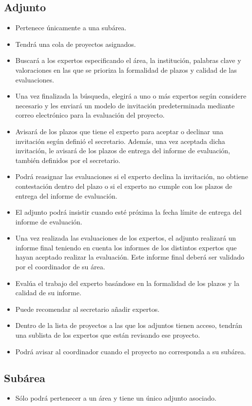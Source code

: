 \documentclass[12pt,a4paper,spanish,twoside]{book}
\begin{document}
\subsection{Adjunto}
\begin{itemize}
\item Pertenece únicamente a una subárea.
\item Tendrá una cola de proyectos asignados.
\item Buscará a los expertos especificando el área, la institución, palabras
  clave y valoraciones en las que se prioriza la formalidad de plazos y
  calidad de las evaluaciones. 
\item Una vez finalizada la búsqueda, elegirá a uno o más expertos según
  considere necesario y les enviará un modelo de invitación predeterminada
  mediante correo electrónico para la  evaluación del proyecto.  
\item Avisará de los plazos que tiene el experto para aceptar o declinar una
  invitación según definió el secretario. Además, una vez aceptada dicha
  invitación, le avisará de los plazos de entrega del informe de evaluación,
  también definidos por el secretario. 
\item Podrá reasignar las evaluaciones si el experto declina la invitación,
  no obtiene contestación dentro del plazo o si el experto no cumple con los
  plazos de entrega del informe de evaluación.
\item El adjunto podrá insistir cuando esté próxima la fecha límite de
  entrega del informe de evaluación. 
\item Una vez realizada las evaluaciones de los expertos, el adjunto
  realizará un informe final teniendo en cuenta los informes de los distintos
  expertos que hayan aceptado realizar la evaluación. Este informe final
  deberá ser validado por el coordinador de su área. 
\item Evalúa el trabajo del experto basándose en la formalidad de los plazos
  y la calidad de su informe. 
\item Puede recomendar al secretario añadir expertos.
\item Dentro de la lista de proyectos a las que los adjuntos tienen acceso,
  tendrán una sublista de los expertos que están revisando ese proyecto. 
\item Podrá avisar al coordinador cuando el proyecto no corresponda a su
  subárea. 
\end{itemize}

\subsection{Subárea}
\begin{itemize}
\item Sólo podrá pertenecer a un área y tiene un único adjunto asociado.
\end{itemize}
\end{document}
